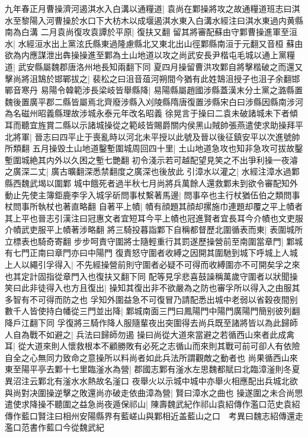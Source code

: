 九年春正月曹操濟河遏淇水入白溝以通糧道|{
	袁尚在鄴操將攻之故通糧道班志曰淇水至黎陽入河曹操於水口下大枋木以成堰遏淇水東入白溝水經注曰淇水東過内黄縣南為白溝}
二月袁尚復攻袁譚於平原|{
	復扶又翻}
留其將審配蘇由守鄴曹操進軍至洹水|{
	水經洹水出上黨泫氏縣東過隆慮縣北又東北出山徑鄴縣南洹于元翻又音桓}
蘇由欲為内應謀泄出犇操操進至鄴為土山地道以攻之尚武安長尹楷屯毛城以通上黨糧道|{
	武安縣屬魏郡唐洛州地長知兩翻下同}
夏四月操留曹洪攻鄴自將擊楷破之而還又擊尚將沮鵠於邯鄲拔之|{
	裴松之曰沮音葅河朔間今猶有此姓鵠沮授子也沮子余翻邯鄲音寒丹}
易陽令韓範涉長梁岐皆舉縣降|{
	易陽縣屬趙國涉縣蓋漢末分土黨之潞縣置魏後置廣平郡二縣皆屬焉北齊廢涉縣入刈陵縣隋唐復置涉縣宋白曰涉縣因縣南涉河為名磁州昭義縣理故涉城永泰元年改名昭義}
徐晃言于操曰二袁未破諸城未下者傾耳而聽宜旌賞二縣以示諸城操從之範岐皆賜爵關内侯黑山賊帥張燕遣使求助操拜平北將軍|{
	晉志曰四平止于喪亂時以河北未平授以此號及晉以後征鎮安平以次進號帥所類翻}
五月操毁土山地道鑿塹圍城周回四十里|{
	土山地道急攻也知非急攻可拔故鑿塹圍城絶其内外以久困之塹七艷翻}
初令淺示若可越配望見笑之不出爭利操一夜濬之廣深二丈|{
	廣古曠翻深悉禁翻度之廣深也後放此}
引漳水以灌之|{
	水經注漳水過鄴縣西魏武堨以圍鄴}
城中餓死者過半秋七月尚將兵萬餘人還救鄴未到欲令審配知外動止先使主簿鉅鹿李孚入城孚斫問事杖繫著馬邊|{
	問事卒也主行杖猶伍伯之類問事杖問事所執杖也著直略翻}
自著平上幘|{
	幘有顔題其顔却摞施巾連題却覆之平上幘者其上平也晉志引漢注曰冠惠文者宜短耳今平上幘也冠進賢者宜長耳今介幘也文吏服介幘武吏服平上幘著涉略翻}
將三騎投暮詣鄴下自稱都督歷北圍循表而東|{
	表圍城所立標表也騎奇寄翻}
步步呵責守圍將士隨輕重行其罰遂歷操營前至南圍當章門|{
	鄴城有七門正南曰章門亦曰中陽門}
復責怒守圍者收縛之因開其圍馳到城下呼城上人城上人以繩引孚得入|{
	不先經操營前則守圍者必疑不可得而收縛圍亦不可開矣孚之來也其定計固指從章門入也復扶又翻下同}
配等見孚悲喜鼓譟稱萬歲守圍者以狀聞操笑曰此非徒得入也方且復出|{
	操知其復出非不欲嚴為之防也審孚所以得入之由服其多智有不可得而防之也}
孚知外圍益急不可復冒乃請配悉出城中老弱以省穀夜間别數千人皆使持白幡從三門並出降|{
	鄴城南面三門曰鳳陽門中陽門廣陽門簡别彼列翻降戶江翻下同}
孚復將三騎作降人服隨輩夜出突圍得去尚兵既至諸將皆以為此歸師人自為戰不如避之|{
	兵法曰歸師勿遏}
操曰尚從大道來當避之若循西山來者此成禽耳|{
	從大道來則人懷救根本不顧勝敗有必死之志循山而來則其戰可前可卻人有依險自全之心無同力致命之意操所以料尚者如此兵法所謂觀敵之動者也}
尚果循西山來東至陽平亭去鄴十七里臨滏水為營|{
	郡國志鄴有滏水左思魏都賦曰北臨漳滏則冬夏異沼注云鄴北有滏水水熱故名滏口}
夜舉火以示城中城中亦舉火相應配出兵城北欲與尚對决圍操逆擊之敗還尚亦破走依曲漳為營|{
	賢曰漳水之曲也}
操遂圍之未合尚愳遣使求降操不聽圍之益急尚夜遁保祁山|{
	陳壽魏武紀作祁山袁紹傳作濫口范史袁紹傳作藍口賢注曰相州安陽縣界有藍嵯山與鄴相近盖藍山之口　考異曰魏志紹傳還走濫口范書作藍口今從魏武紀}
